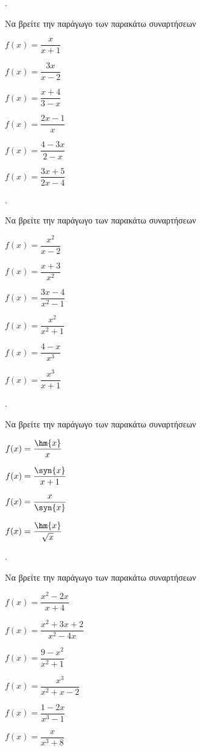 \documentclass[11pt,a4paper,twocolumn]{article}
\newcounter{askhsh}
\newcommand{\askhsh}{\large\theaskhsh.\ \addtocounter{askhsh}{1}}
\begin{document}
\askhsh Να βρείτε την παράγωγο των παρακάτω συναρτήσεων
\begin{multicols}{2}
\begin{alist}
\item $ f(x)=\dfrac{x}{x+1} $
\item $ f(x)=\dfrac{3x}{x-2} $
\item $ f(x)=\dfrac{x+4}{3-x} $
\item $ f(x)=\dfrac{2x-1}{x} $
\item $ f(x)=\dfrac{4-3x}{2-x} $
\item $ f(x)=\dfrac{3x+5}{2x-4} $
\end{alist}
\end{multicols}
\askhsh Να βρείτε την παράγωγο των παρακάτω συναρτήσεων
\begin{multicols}{2}
\begin{alist}
\item $ f(x)=\dfrac{x^2}{x-2} $
\item $ f(x)=\dfrac{x+3}{x^2} $
\item $ f(x)=\dfrac{3x-4}{x^2-1} $
\item $ f(x)=\dfrac{x^2}{x^2+1} $
\item $ f(x)=\dfrac{4-x}{x^3} $
\item $ f(x)=\dfrac{x^3}{x+1} $
\end{alist}
\end{multicols}
\askhsh Να βρείτε την παράγωγο των παρακάτω συναρτήσεων
\begin{multicols}{2}
\begin{alist}
\item $ f(x)=\dfrac{\hm{x}}{x} $
\item $ f(x)=\dfrac{\syn{x}}{x+1} $
\item $ f(x)=\dfrac{x}{\syn{x}} $
\item $ f(x)=\dfrac{\hm{x}}{\sqrt{x}} $
\end{alist}
\end{multicols}
\askhsh Να βρείτε την παράγωγο των παρακάτω συναρτήσεων
\begin{multicols}{2}
\begin{alist}
\item $ f(x)=\dfrac{x^2-2x}{x+4} $
\item $ f(x)=\dfrac{x^2+3x+2}{x^2-4x} $
\item $ f(x)=\dfrac{9-x^2}{x^2+1} $
\item $ f(x)=\dfrac{x^3}{x^2+x-2} $
\item $ f(x)=\dfrac{1-2x}{x^3-1} $
\item $ f(x)=\dfrac{x}{x^3+8} $
\end{alist}
\end{multicols}
\end{document}
